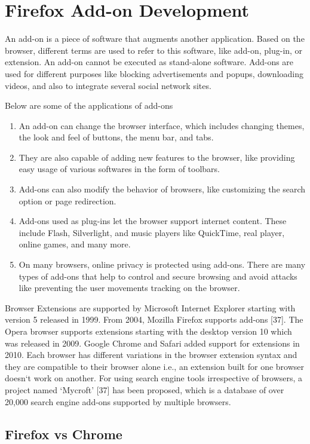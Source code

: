 \chapter{Firefox Add-on Development}

An add-on is a piece of software that augments another application. Based on the browser, different terms are used to refer to this software, like add-on, plug-in, or extension. An add-on cannot be executed as stand-alone software. Add-ons are used for different purposes like blocking advertisements and popups, downloading videos, and also to integrate several social network sites. 

Below are some of the applications of add-ons
\begin{enumerate}
\item An add-on can change the browser interface, which includes changing themes, the look and feel of buttons, the menu bar, and tabs.
\item They are also capable of adding new features to the browser, like providing easy usage of various softwares in the form of toolbars. 
\item Add-ons can also modify the behavior of browsers, like customizing the search option or page redirection. 
\item Add-ons used as plug-ins let the browser support internet content. These include Flash, Silverlight, and music players like QuickTime, real player, online games, and many more. 
\item On many browsers, online privacy is protected using add-ons. There are many types of add-ons that help to control and secure browsing and avoid attacks like preventing the user movements tracking on the browser.
\end{enumerate}

Browser Extensions are supported by Microsoft Internet Explorer starting with version 5 released in 1999. From 2004, Mozilla Firefox supports add-ons [37]. The Opera browser supports extensions starting with the desktop version 10 which was released in 2009. Google Chrome and Safari added support for extensions in 2010. Each browser has different variations in the browser extension syntax and they are compatible to their browser alone i.e., an extension built for one browser doesn`t work on another. For using search engine tools irrespective of browsers, a project named `Mycroft' [37] has been proposed, which is a database of over 20,000 search engine add-ons supported by multiple browsers.

\section{Firefox vs Chrome} 

